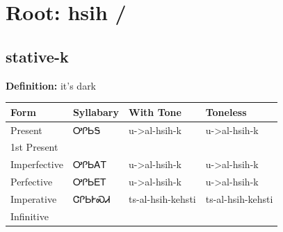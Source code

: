 \documentclass{article}%
\begin{document}
%
\normalsize%
\section*{Root: hsih / }%
\subsection*{stative-k}%
\textbf{Definition: }%
it’s dark%
\\[0.5em]%
\begin{tabular}{|l|l|l|l|}%
\hline%
\textbf{Form}&\textbf{Syllabary}&\textbf{With Tone}&\textbf{Toneless}\\%
\hline%
Present&ᎤᎵᏏᎦ&u{-}>al{-}hsih{-}k&u{-}>al{-}hsih{-}k\\%
1st Present&&&\\%
Imperfective&ᎤᎵᏏᎪᎢ&u{-}>al{-}hsih{-}k&u{-}>al{-}hsih{-}k\\%
Perfective&ᎤᎵᏏᎬᎢ&u{-}>al{-}hsih{-}k&u{-}>al{-}hsih{-}k\\%
Imperative&ᏣᎵᏏᎨᏍᏗ&ts{-}al{-}hsih{-}kehsti&ts{-}al{-}hsih{-}kehsti\\%
Infinitive&&&\\%
\hline%
\end{tabular}%
\\[1em]%
\end{document}
